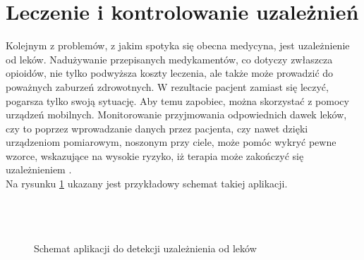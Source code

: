 \section{Leczenie i kontrolowanie uzależnień}
Kolejnym z problemów, z jakim spotyka się obecna medycyna, jest uzależnienie od leków. Nadużywanie przepisanych medykamentów, co dotyczy zwłaszcza opioidów, nie tylko podwyższa koszty leczenia, ale także może prowadzić do poważnych zaburzeń zdrowotnych. W rezultacie pacjent zamiast się leczyć, pogarsza tylko swoją sytuację. Aby temu zapobiec, można skorzystać z pomocy urządzeń mobilnych. Monitorowanie przyjmowania odpowiednich dawek leków, czy to poprzez wprowadzanie danych przez pacjenta, czy nawet dzięki urządzeniom pomiarowym, noszonym przy ciele, może pomóc wykryć pewne wzorce, wskazujące na wysokie ryzyko, iż terapia może zakończyć się uzależnieniem \cite{ISoMAHN&CVarshney2014Mobilehealth:medicationabuseandaddictionaddictionmobilehealthmonitoringprescriptionabuse}.\\
Na rysunku \ref{fig:drugs} ukazany jest przykładowy schemat takiej aplikacji.
\\ \\ \\ \\
\begin{figure}[ht!]
  \centering
  \caption{Schemat aplikacji do detekcji uzależnienia od leków}
  \label{fig:drugs}
\end{figure}

